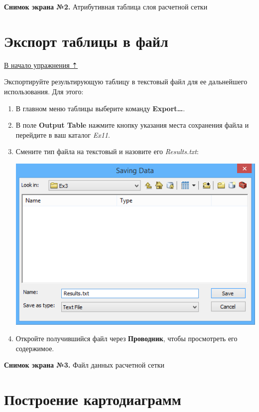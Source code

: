 \documentclass[]{book}
\theoremstyle{definition}
\theoremstyle{definition}
\theoremstyle{definition}
\theoremstyle{remark}
\begin{document}
\textbf{Снимок экрана №2.} Атрибутивная таблица слоя расчетной сетки

\hypertarget{land-cover-hydro-export}{%
\section{Экспорт таблицы в файл}\label{land-cover-hydro-export}}

\protect\hyperlink{land-cover-hydro}{В начало упражнения ⇡}

Экспортируйте результирующую таблицу в текстовый файл для ее дальнейшего
использования. Для этого:

\begin{enumerate}
\def\labelenumi{\arabic{enumi}.}
\item
  В главном меню таблицы выберите команду \textbf{Export\ldots{}}.
\item
  В поле \textbf{Output Table} нажмите кнопку указания места сохранения
  файла и перейдите в ваш каталог \emph{Ex11}.
\item
  Смените тип файла на текстовый и назовите его \emph{Results.txt}:

  \includegraphics{images/Ex11/image14.png}
\item
  Откройте получившийся файл через \textbf{Проводник}, чтобы просмотреть
  его содержимое.
\end{enumerate}

\textbf{Снимок экрана №3.} Файл данных расчетной сетки

\hypertarget{land-cover-hydro-diagrams}{%
\section{Построение картодиаграмм}\label{land-cover-hydro-diagrams}}
\end{document}
